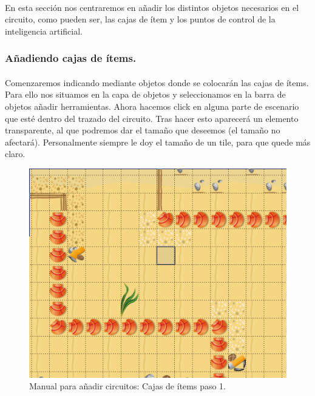 \paragraph{}
En esta sección nos centraremos en añadir los distintos objetos necesarios en el circuito, como pueden ser, las cajas de ítem
y los puntos de control de la inteligencia artificial.

\subsubsection{Añadiendo cajas de ítems.}

\paragraph{}
Comenzaremos indicando mediante objetos donde se colocarán las cajas de ítems. Para ello nos situamos en la capa de objetos y 
seleccionamos en la barra de objetos añadir herramientas. Ahora hacemos click en alguna parte de escenario que esté dentro del
trazado del circuito. Tras hacer esto aparecerá un elemento transparente, al
que podremos dar el tamaño que deseemos (el tamaño no
afectará). Personalmente siempre le doy el tamaño de un tile, para que quede más claro.

\begin{figure}[H]
  \label{cajas_items1}
  \begin{center}
    \includegraphics[scale=0.5]{imagenes/manualcircuito/cajas_items1.png}
  \end{center}
  \caption{Manual para añadir circuitos: Cajas de ítems paso 1.}
\end{figure}

